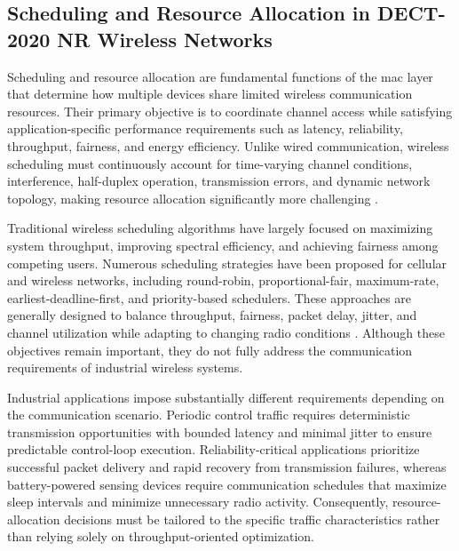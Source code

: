 \documentclass[12pt,a4paper]{article}
\begin{document}

\subsection{Scheduling and Resource Allocation in DECT-2020 NR Wireless Networks}
\label{subsec:scheduling}

Scheduling and resource allocation are fundamental functions of the \gls{mac} layer that determine how multiple devices share limited wireless communication resources. Their primary objective is to coordinate channel access while satisfying application-specific performance requirements such as latency, reliability, throughput, fairness, and energy efficiency. Unlike wired communication, wireless scheduling must continuously account for time-varying channel conditions, interference, half-duplex operation, transmission errors, and dynamic network topology, making resource allocation significantly more challenging \cite{luFairSchedulingWireless1999a,fattahOverviewSchedulingAlgorithms2002a}.

Traditional wireless scheduling algorithms have largely focused on maximizing system throughput, improving spectral efficiency, and achieving fairness among competing users. Numerous scheduling strategies have been proposed for cellular and wireless networks, including round-robin, proportional-fair, maximum-rate, earliest-deadline-first, and priority-based schedulers. These approaches are generally designed to balance throughput, fairness, packet delay, jitter, and channel utilization while adapting to changing radio conditions \cite{andrewsProvidingQualityService2001,fattahOverviewSchedulingAlgorithms2002a}. Although these objectives remain important, they do not fully address the communication requirements of industrial wireless systems.

Industrial applications impose substantially different requirements depending on the communication scenario. Periodic control traffic requires deterministic transmission opportunities with bounded latency and minimal jitter to ensure predictable control-loop execution. Reliability-critical applications prioritize successful packet delivery and rapid recovery from transmission failures, whereas battery-powered sensing devices require communication schedules that maximize sleep intervals and minimize unnecessary radio activity. Consequently, resource-allocation decisions must be tailored to the specific traffic characteristics rather than relying solely on throughput-oriented optimization.
\end{document}
